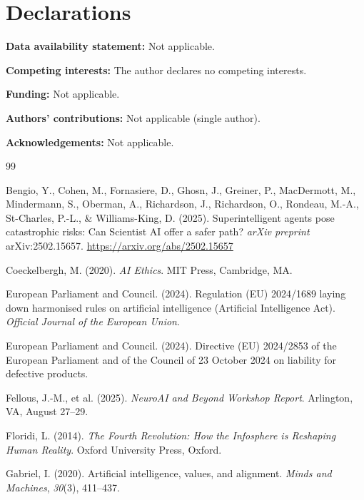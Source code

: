 \documentclass[12pt]{article}
\begin{document}
\section*{Declarations}

\noindent\textbf{Data availability statement:} Not applicable.

\noindent\textbf{Competing interests:} The author declares no competing interests.

\noindent\textbf{Funding:} Not applicable.

\noindent\textbf{Authors' contributions:} Not applicable (single author).

\noindent\textbf{Acknowledgements:} Not applicable.

\begin{thebibliography}{99}

Bengio, Y., Cohen, M., Fornasiere, D., Ghosn, J., Greiner, P., MacDermott, M., Mindermann, S., Oberman, A., Richardson, J., Richardson, O., Rondeau, M.-A., St-Charles, P.-L., \& Williams-King, D. (2025). Superintelligent agents pose catastrophic risks: Can Scientist AI offer a safer path? \textit{arXiv preprint} arXiv:2502.15657. \url{https://arxiv.org/abs/2502.15657}

Coeckelbergh, M. (2020). \textit{AI Ethics}. MIT Press, Cambridge, MA.

European Parliament and Council. (2024). Regulation (EU) 2024/1689 laying down harmonised rules on artificial intelligence (Artificial Intelligence Act). \textit{Official Journal of the European Union}.

European Parliament and Council. (2024). Directive (EU) 2024/2853 of the European Parliament and of the Council of 23 October 2024 on liability for defective products.

Fellous, J.-M., et al. (2025). \textit{NeuroAI and Beyond Workshop Report}. Arlington, VA, August 27--29.

Floridi, L. (2014). \textit{The Fourth Revolution: How the Infosphere is Reshaping Human Reality}. Oxford University Press, Oxford.

Gabriel, I. (2020). Artificial intelligence, values, and alignment. \textit{Minds and Machines}, \textit{30}(3), 411--437.


\end{thebibliography}
\end{document}
